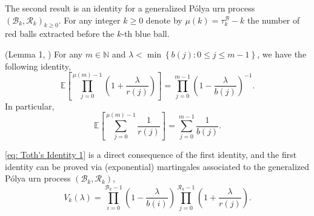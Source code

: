 \documentclass[EJP]{ejpecp} %
\begin{document}
The second result is an identity for a generalized P\'{o}lya urn process $(\mathscr{B}_{k},\mathscr{R}_{k})_{k \ge 0}$. For any integer $k\geq 0$ denote by $\mu(k)= \tau^{\mathscr{B}}_k - k$ the number of red balls extracted before the $k$-th blue ball. 
\begin{lemma}(Lemma 1, \cite{T96}) \label{lm: Toth's Identity}
	For any $m\in \mathbb{N}$ and $\lambda < \min\left\{ b(j): 0\leq j\leq m-1 \right\}$, we have the following identity,
	$$  \mathbb{E}\left[  \prod_{j=0}^{ \mu(m)-1 } \left(1+ \frac{\lambda}{r(j)}   \right) \right] =   \prod_{j=0}^{ m-1 } \left(1- \frac{\lambda}{b(j)}   \right)^{-1}.   $$ 
	In particular, 
	\begin{equation}\label{eq: Toth's Identity 1}
		\mathbb{E}\left[  \sum_{j=0}^{ \mu(m)-1 } \frac{1}{r(j)}   \right] =   \sum_{j=0}^{ m-1 } \frac{1}{b(j)}.
	\end{equation}	
\end{lemma}
\eqref{eq: Toth's Identity 1} is a direct consequence of the first identity, and the first identity can be proved via (exponential) martingales associated to the generalized P\'{o}lya urn process $(\mathscr{B}_{k},\mathscr{R}_{k})$, 
\[
V_k(\lambda) = \prod_{i=0}^{ \mathscr{B}_{k}-1 } \left(1-\frac{\lambda}{b(i)}\right) \prod_{j=0}^{\mathscr{R}_{k}-1 } \left(1+\frac{\lambda}{r(j)}\right)
.\]
\end{document}
